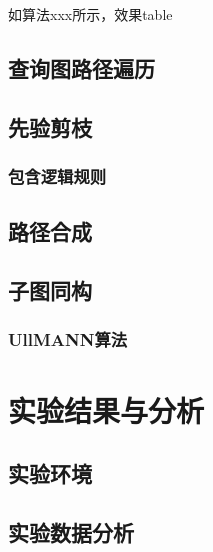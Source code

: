\documentclass{XDBAthesis}
\begin{document}
如算法xxx所示，效果table
\subsection{查询图路径遍历}
\subsection{先验剪枝}
\subsubsection{包含逻辑规则}
\subsection{路径合成}
\subsection{子图同构}
\subsubsection{UllMANN算法}


\section{实验结果与分析}
\subsection{实验环境}
\subsection{实验数据分析}


\ifx\allfiles\undefined


\end{document}
